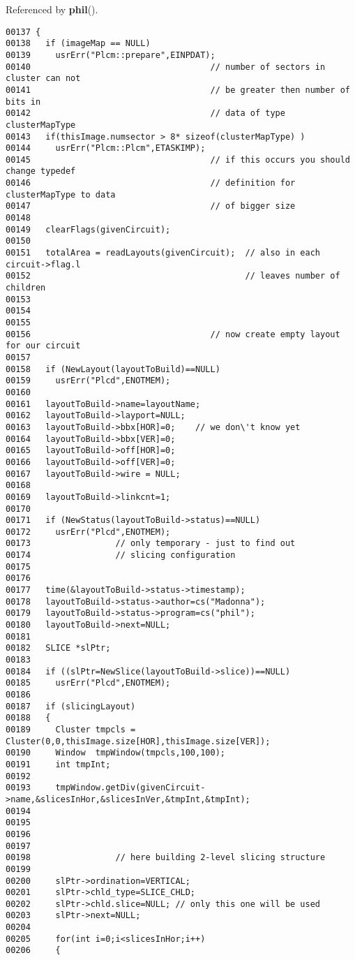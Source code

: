 Referenced by {\bf phil}().\small\begin{verbatim}00137 {
00138   if (imageMap == NULL)
00139     usrErr("Plcm::prepare",EINPDAT);
00140                                    // number of sectors in cluster can not
00141                                    // be greater then number of bits in
00142                                    // data of type clusterMapType
00143   if(thisImage.numsector > 8* sizeof(clusterMapType) )
00144     usrErr("Plcm::Plcm",ETASKIMP);
00145                                    // if this occurs you should change typedef
00146                                    // definition for clusterMapType to data
00147                                    // of bigger size
00148 
00149   clearFlags(givenCircuit);
00150 
00151   totalArea = readLayouts(givenCircuit);  // also in each circuit->flag.l
00152                                           // leaves number of children
00153 
00154 
00155 
00156                                    // now create empty layout for our circuit
00157 
00158   if (NewLayout(layoutToBuild)==NULL)
00159     usrErr("Plcd",ENOTMEM);
00160 
00161   layoutToBuild->name=layoutName;
00162   layoutToBuild->layport=NULL;
00163   layoutToBuild->bbx[HOR]=0;    // we don\'t know yet
00164   layoutToBuild->bbx[VER]=0;
00165   layoutToBuild->off[HOR]=0;
00166   layoutToBuild->off[VER]=0;
00167   layoutToBuild->wire = NULL;
00168 
00169   layoutToBuild->linkcnt=1;
00170 
00171   if (NewStatus(layoutToBuild->status)==NULL)
00172     usrErr("Plcd",ENOTMEM);
00173                 // only temporary - just to find out
00174                 // slicing configuration
00175 
00176 
00177   time(&layoutToBuild->status->timestamp);
00178   layoutToBuild->status->author=cs("Madonna");
00179   layoutToBuild->status->program=cs("phil");
00180   layoutToBuild->next=NULL;
00181 
00182   SLICE *slPtr;
00183 
00184   if ((slPtr=NewSlice(layoutToBuild->slice))==NULL)
00185     usrErr("Plcd",ENOTMEM);
00186 
00187   if (slicingLayout)
00188   {
00189     Cluster tmpcls = Cluster(0,0,thisImage.size[HOR],thisImage.size[VER]);
00190     Window  tmpWindow(tmpcls,100,100);
00191     int tmpInt;
00192 
00193     tmpWindow.getDiv(givenCircuit->name,&slicesInHor,&slicesInVer,&tmpInt,&tmpInt);
00194 
00195 
00196 
00197 
00198                 // here building 2-level slicing structure
00199 
00200     slPtr->ordination=VERTICAL;    
00201     slPtr->chld_type=SLICE_CHLD;
00202     slPtr->chld.slice=NULL; // only this one will be used
00203     slPtr->next=NULL;
00204     
00205     for(int i=0;i<slicesInHor;i++)
00206     {

\end{verbatim}
